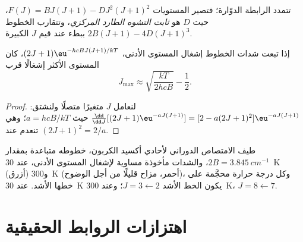 \begin{definition}\label{def:b3:rovibrational-spectroscopy:centrifugal}
تتمدد الرابطة الدوّارة؛ فتصير المستويات $F(J) = BJ(J+1) - DJ^2(J+1)^2$،
حيث $D$ هو \emph{ثابت التشوه الطارد المركزي}،
وتتقارب الخطوط $2B(J+1) - 4D(J+1)^3$ ببطء عند
قيم $J$ الكبيرة.
\end{definition}

\begin{proposition}\label{prop:b3:rovibrational-spectroscopy:jmax}
إذا تبعت شدات الخطوط إشغال المستوى الأدنى، $(2J+1)
\eu^{-hcBJ(J+1)/kT}$، كان المستوى الأكثر إشغالًا قرب
\[
J_{\max} \approx \sqrt{\frac{kT}{2hcB}} - \frac12.
\]
\end{proposition}

\begin{proof}
لنعامل $J$ متغيرًا متصلًا ولنشتق: $\frac{\dd}{\dd J}[(2J+1)\eu^{-aJ(J+1)}]
= [2 - a(2J+1)^2]\eu^{-aJ(J+1)}$ حيث $a = hcB/kT$؛ وهي تنعدم عند $(2J + 1)^2 =
2/a$.
\end{proof}

\begin{omfigure}

{\small طيف الامتصاص الدوراني لأحادي أكسيد الكربون، خطوطه متباعدة
بمقدار $2B = \qty{3.845}{cm^{-1}}$، والشدات مأخوذة مساوية لإشغال
المستوى الأدنى، عند \qty{30}{K} (أزرق) و\qty{300}{K} (أحمر، مزاح قليلًا من أجل
الوضوح)، وكل درجة حرارة محجَّمة على خطها الأشد. عند \qty{30}{K} يكون الخط الأشد
$J = 3 \leftarrow 2$؛ وعند \qty{300}{K}، $J = 8 \leftarrow 7$.}
\end{omfigure}

\section{اهتزازات الروابط الحقيقية}\label{sec:b3:rovibrational-spectroscopy:real-bonds}

